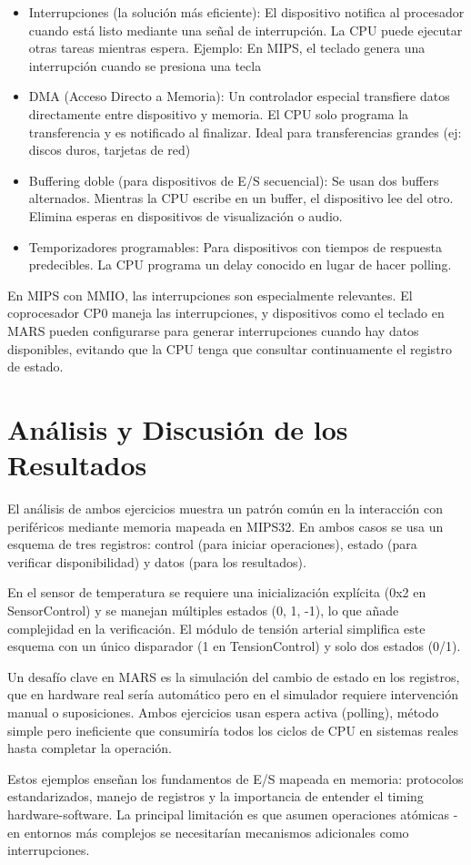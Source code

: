\documentclass{article}
\begin{document}
\begin{itemize}
\item Interrupciones (la solución más eficiente): El dispositivo notifica al procesador cuando está listo mediante una señal de interrupción. La CPU puede ejecutar otras tareas mientras espera. Ejemplo: En MIPS, el teclado genera una interrupción cuando se presiona una tecla
\item DMA (Acceso Directo a Memoria): Un controlador especial transfiere datos directamente entre dispositivo y memoria. El CPU solo programa la transferencia y es notificado al finalizar. Ideal para transferencias grandes (ej: discos duros, tarjetas de red)
\item Buffering doble (para dispositivos de E/S secuencial): Se usan dos buffers alternados. Mientras la CPU escribe en un buffer, el dispositivo lee del otro. Elimina esperas en dispositivos de visualización o audio.
\item Temporizadores programables: Para dispositivos con tiempos de respuesta predecibles. La CPU programa un delay conocido en lugar de hacer polling.
\end{itemize}

En MIPS con MMIO, las interrupciones son especialmente relevantes. El coprocesador CP0 maneja las interrupciones, y dispositivos como el teclado en MARS pueden configurarse para generar interrupciones cuando hay datos disponibles, evitando que la CPU tenga que consultar continuamente el registro de estado.

\section{Análisis y Discusión de los Resultados}

El análisis de ambos ejercicios muestra un patrón común en la interacción con periféricos mediante memoria mapeada en MIPS32. En ambos casos se usa un esquema de tres registros: control (para iniciar operaciones), estado (para verificar disponibilidad) y datos (para los resultados).\newline

En el sensor de temperatura se requiere una inicialización explícita (0x2 en SensorControl) y se manejan múltiples estados (0, 1, -1), lo que añade complejidad en la verificación. El módulo de tensión arterial simplifica este esquema con un único disparador (1 en TensionControl) y solo dos estados (0/1).\newline

Un desafío clave en MARS es la simulación del cambio de estado en los registros, que en hardware real sería automático pero en el simulador requiere intervención manual o suposiciones. Ambos ejercicios usan espera activa (polling), método simple pero ineficiente que consumiría todos los ciclos de CPU en sistemas reales hasta completar la operación.\newline

Estos ejemplos enseñan los fundamentos de E/S mapeada en memoria: protocolos estandarizados, manejo de registros y la importancia de entender el timing hardware-software. La principal limitación es que asumen operaciones atómicas - en entornos más complejos se necesitarían mecanismos adicionales como interrupciones.

\endgroup
\end{document}
